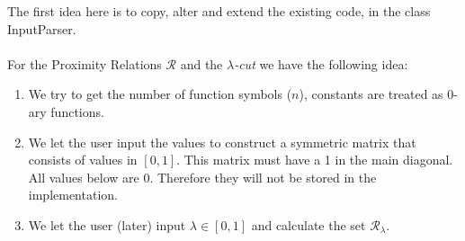 \documentclass{article}
\begin{document}
The first idea here is to copy, alter and extend the existing code, in the class InputParser.
\\ \ \\
\noindent
For the Proximity Relations \(\mathcal{R}\) and the \(\lambda\)\textit{-cut} we have the following idea:\\
\begin{enumerate}
	\item We try to get the number of function symbols (\(n\)), constants are treated as 0-ary functions.
	\item We let the user input the values to construct a symmetric matrix that consists of values in \([0,1]\). This matrix must have a 1 in the main diagonal. All values below are 0. Therefore they will not be stored in the implementation.
	\item We let the user (later) input \(\lambda\in[0,1]\) and calculate the set \(\mathcal{R}_\lambda\).
\end{enumerate}
\end{document}
